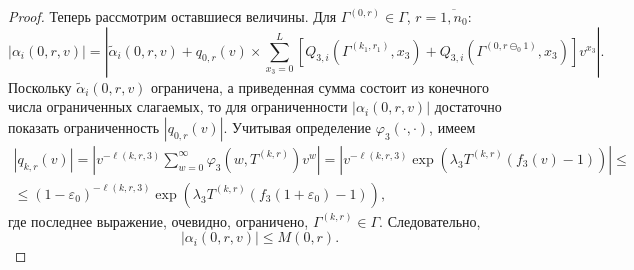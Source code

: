 \begin{proof}
Теперь рассмотрим оставшиеся величины. Для $\Gamma^{(0, r)} \in \Gamma$,  $r=\overline{1, n_0}$:
\begin{equation*}
|\alpha_i(0, r, v)| = | \tilde{\alpha}_i(0, r, v) + q_{0, r}(v) \times \sum_{x_3=0}^{L} \left[ Q_{3, i}(\Gamma^{(k_1, r_1)}, x_3) + Q_{3, i}(\Gamma^{(0, r\ominus_0 1)}, x_3) \right] v^{x_3}|.
\end{equation*}
Поскольку $\tilde{\alpha}_i(0, r, v)$ ограничена,  а приведенная сумма состоит из конечного числа ограниченных слагаемых,  то для ограниченности $|\alpha_i(0, r, v)| $ достаточно показать ограниченность $|q_{0, r}(v)|$. Учитывая определение $\varphi_3(\cdot, \cdot)$,  имеем
\begin{multline*}
|q_{k, r}(v)| = | v^{-\ell(k, r, 3)}\sum_{w=0}^{\infty} \varphi_3(w, T^{(k, r)})v^w| = | v^ {-\ell(k, r, 3)} \exp{(\lambda_3 T^{(k, r)} (f_3(v) - 1))} |
\leqslant \\ 
\leqslant  (1-\varepsilon_0) ^ {-\ell(k, r, 3)} \exp{(\lambda_3 T^{(k, r)} (f_3(1+\varepsilon_0) - 1))}, 
\end{multline*}
где последнее выражение,  очевидно,  ограничено,  $\Gamma^{(k, r)} \in \Gamma$. Следовательно, 
\begin{equation*}
|\alpha_i(0, r, v)| \leqslant M(0, r).
\end{equation*}


\end{proof}
